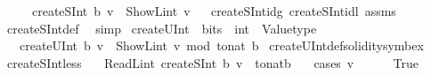 \begin{isabellebody}
\ \ \ \ \ {\isachardoublequoteopen}createSInt\ b\ v\ {\isacharequal}{\kern0pt}\ ShowL\isactrlsub i\isactrlsub n\isactrlsub t\ v{\isachardoublequoteclose}%
\isadelimproof
\ %
\endisadelimproof
%
\isatagproof
{}\isamarkupfalse%
\ createSInt{\isacharunderscore}{\kern0pt}id{\isacharunderscore}{\kern0pt}g{}\ createSInt{\isacharunderscore}{\kern0pt}id{\isacharunderscore}{\kern0pt}l{}\ assms\ \isamarkupfalse%
\ createSInt{\isacharunderscore}{\kern0pt}def\ \isamarkupfalse%
\ simp%
\endisatagproof
{\isafoldproof}%
%
\isadelimproof
%
\endisadelimproof
\isanewline
\isanewline
{}\isamarkupfalse%
\ createUInt\ {\isacharcolon}{\kern0pt}{\isacharcolon}{\kern0pt}\ {\isachardoublequoteopen}bits\ {\isasymRightarrow}\ int\ {\isasymRightarrow}\ Valuetype{\isachardoublequoteclose}\isanewline
\ \ \ {\isachardoublequoteopen}createUInt\ b\ v\ {\isacharequal}{\kern0pt}\ ShowL\isactrlsub i\isactrlsub n\isactrlsub t\ {\isacharparenleft}{\kern0pt}v\ mod\ {\isacharparenleft}{\kern0pt}{}{\isacharcircum}{\kern0pt}{\isacharparenleft}{\kern0pt}to{\isacharunderscore}{\kern0pt}nat\ b{\isacharparenright}{\kern0pt}{\isacharparenright}{\kern0pt}{\isacharparenright}{\kern0pt}{\isachardoublequoteclose}\isanewline
{}\isamarkupfalse%
\ createUInt{\isacharunderscore}{\kern0pt}def{\isacharbrackleft}{\kern0pt}solidity{\isacharunderscore}{\kern0pt}symbex{\isacharbrackright}{\kern0pt}\isanewline
\isanewline
{}\isamarkupfalse%
\ createSInt{\isacharunderscore}{\kern0pt}less{\isacharcolon}{\kern0pt}\isanewline
\ \ \ {\isachardoublequoteopen}ReadL\isactrlsub i\isactrlsub n\isactrlsub t\ {\isacharparenleft}{\kern0pt}createSInt\ b\ v{\isacharparenright}{\kern0pt}\ {\isacharless}{\kern0pt}\ {}{\isacharcircum}{\kern0pt}{\isacharparenleft}{\kern0pt}{\isacharparenleft}{\kern0pt}to{\isacharunderscore}{\kern0pt}nat{\isacharparenleft}{\kern0pt}b{\isacharparenright}{\kern0pt}\ {\isacharminus}{\kern0pt}\ {}{\isacharparenright}{\kern0pt}{\isacharparenright}{\kern0pt}{\isachardoublequoteclose}\isanewline
%
\isadelimproof
%
\endisadelimproof
%
\isatagproof
{}\isamarkupfalse%
\ {\isacharparenleft}{\kern0pt}cases\ {\isachardoublequoteopen}v\ {\isasymge}\ {}{\isachardoublequoteclose}{\isacharparenright}{\kern0pt}\isanewline
\ \ \isamarkupfalse%
\ True\isanewline
\ \ \isamarkupfalse%
\ \isamarkupfalse%

\end{isabellebody}
